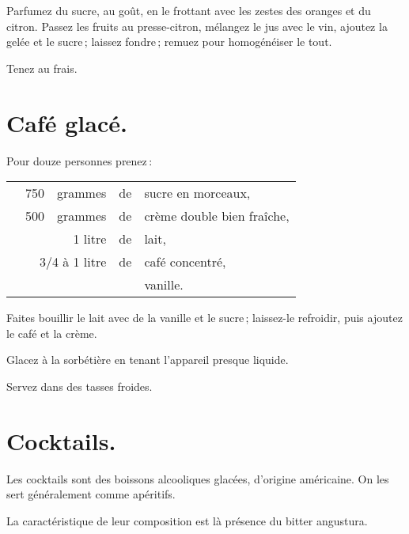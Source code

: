Parfumez du sucre, au goût, en le frottant avec les zestes des oranges et du
citron. Passez les fruits au presse-citron, mélangez le jus avec le vin,
ajoutez la gelée et le sucre ; laissez fondre ; remuez pour homogénéiser le
tout.

Tenez au frais.

\section*{\centering Café glacé.}
{}

Pour douze personnes prenez :

\footnotesize
\begin{longtable}{rrrrp{16em}}
  & 750 & grammes & de & sucre en morceaux,                                                               \\
  & 500 & grammes & de & crème double bien fraîche,                                                       \\
  & \multicolumn{2}{r}{1 litre} & de & lait,                                                              \\
  & \multicolumn{2}{r}{3/4 à 1 litre} & de & café concentré,                                              \\
  &     &         &    & vanille.                                                                         \\
\end{longtable}
\normalsize

Faites bouillir le lait avec de la vanille et le sucre ; laissez-le refroidir,
puis ajoutez le café et la crème.

Glacez à la sorbétière en tenant l'appareil presque liquide.

Servez dans des tasses froides.

\section*{\centering Cocktails.}
{}

Les cocktails sont des boissons alcooliques glacées, d'origine américaine. On
les sert généralement comme apéritifs.

La caractéristique de leur composition est là présence du bitter angustura.

